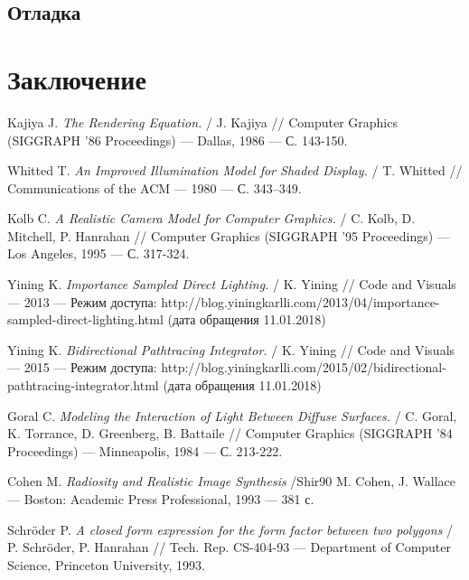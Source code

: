 \documentclass[12pt]{article}
\begin{document}
\subsection{Отладка}
\newpage\section*{Заключение}

\newpage
\begin{thebibliography}{9} %
Kajiya J.
\textit{The Rendering Equation.} / 
J. Kajiya //
Computer Graphics (SIGGRAPH ’86 Proceedings) --- Dallas, 1986 --- С. 143-150.

Whitted T.
\textit{An Improved Illumination Model for Shaded Display.} / 
T. Whitted //
Communications of the ACM --- 1980 --- С. 343–349.

Kolb C.
\textit{A Realistic Camera Model for Computer Graphics.} /
C. Kolb, D. Mitchell, P. Hanrahan //
Computer Graphics (SIGGRAPH ’95 Proceedings) --- Los Angeles, 1995 --- С. 317-324.

Yining K.
\textit{Importance Sampled Direct Lighting.} / 
K. Yining //
Code and Visuals --- 2013 --- Режим доступа: http://blog.yiningkarlli.com/2013/04/importance-sampled-direct-lighting.html (дата обращения 11.01.2018)

Yining K.
\textit{Bidirectional Pathtracing Integrator.} / 
K. Yining //
Code and Visuals --- 2015 --- Режим доступа: http://blog.yiningkarlli.com/2015/02/bidirectional-pathtracing-integrator.html (дата обращения 11.01.2018)

Goral C.
\textit{Modeling the Interaction of Light Between Diffuse Surfaces.} /
C. Goral, K. Torrance, D. Greenberg, B. Battaile //
Computer Graphics (SIGGRAPH ’84 Proceedings) --- Minneapolis, 1984 --- С. 213-222.

Cohen M.
\textit{Radiosity and Realistic Image Synthesis} /Shir90
M. Cohen, J. Wallace
--- Boston: Academic Press Professional, 1993 --- 381 с.

Schr{\"o}der P.
\textit{A closed form expression for the form factor between two polygons} /
P. Schr{\"o}der, P. Hanrahan //
Tech. Rep. CS-404-93 --- Department of Computer Science, Princeton University, 1993.


\end{thebibliography}
\end{document}
